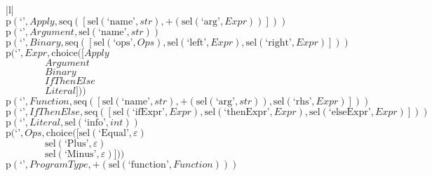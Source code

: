 \footnotesize\begin{center}\begin{tabular}{|l|}\hline
{}
\\\hline
$\mathrm{p}(\text{`'},\mathit{Apply},\mathrm{seq}\left(\left[\mathrm{sel}\left(\text{`name'},str\right), {+}\left(\mathrm{sel}\left(\text{`arg'},\mathit{Expr}\right)\right)\right]\right))$	\\
$\mathrm{p}(\text{`'},\mathit{Argument},\mathrm{sel}\left(\text{`name'},str\right))$	\\
$\mathrm{p}(\text{`'},\mathit{Binary},\mathrm{seq}\left(\left[\mathrm{sel}\left(\text{`ops'},\mathit{Ops}\right), \mathrm{sel}\left(\text{`left'},\mathit{Expr}\right), \mathrm{sel}\left(\text{`right'},\mathit{Expr}\right)\right]\right))$	\\
$\mathrm{p}(\text{`'},\mathit{Expr},\mathrm{choice}([\mathit{Apply}$\\$\qquad\qquad\mathit{Argument}$\\$\qquad\qquad\mathit{Binary}$\\$\qquad\qquad\mathit{IfThenElse}$\\$\qquad\qquad\mathit{Literal}]))$	\\
$\mathrm{p}(\text{`'},\mathit{Function},\mathrm{seq}\left(\left[\mathrm{sel}\left(\text{`name'},str\right), {+}\left(\mathrm{sel}\left(\text{`arg'},str\right)\right), \mathrm{sel}\left(\text{`rhs'},\mathit{Expr}\right)\right]\right))$	\\
$\mathrm{p}(\text{`'},\mathit{IfThenElse},\mathrm{seq}\left(\left[\mathrm{sel}\left(\text{`ifExpr'},\mathit{Expr}\right), \mathrm{sel}\left(\text{`thenExpr'},\mathit{Expr}\right), \mathrm{sel}\left(\text{`elseExpr'},\mathit{Expr}\right)\right]\right))$	\\
$\mathrm{p}(\text{`'},\mathit{Literal},\mathrm{sel}\left(\text{`info'},int\right))$	\\
$\mathrm{p}(\text{`'},\mathit{Ops},\mathrm{choice}([\mathrm{sel}\left(\text{`Equal'},\varepsilon\right)$\\$\qquad\qquad\mathrm{sel}\left(\text{`Plus'},\varepsilon\right)$\\$\qquad\qquad\mathrm{sel}\left(\text{`Minus'},\varepsilon\right)]))$	\\
$\mathrm{p}(\text{`'},\mathit{ProgramType},{+}\left(\mathrm{sel}\left(\text{`function'},\mathit{Function}\right)\right))$	\\
\hline\end{tabular}\end{center}



